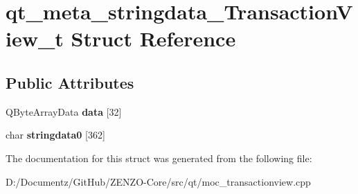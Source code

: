 \hypertarget{structqt__meta__stringdata___transaction_view__t}{}\section{qt\+\_\+meta\+\_\+stringdata\+\_\+\+Transaction\+View\+\_\+t Struct Reference}
\label{structqt__meta__stringdata___transaction_view__t}
\subsection*{Public Attributes}
\begin{DoxyCompactItemize}
\item 
\mbox{\label{structqt__meta__stringdata___transaction_view__t_af53306cc649a0b6436c5f955258c7b5a}} 
Q\+Byte\+Array\+Data {\bfseries data} \mbox{[}32\mbox{]}
\item 
\mbox{\label{structqt__meta__stringdata___transaction_view__t_afecfd814dee997a727a399a43e5cf6e5}} 
char {\bfseries stringdata0} \mbox{[}362\mbox{]}
\end{DoxyCompactItemize}


The documentation for this struct was generated from the following file\+:\begin{DoxyCompactItemize}
\item 
D\+:/\+Documentz/\+Git\+Hub/\+Z\+E\+N\+Z\+O-\/\+Core/src/qt/moc\+\_\+transactionview.\+cpp\end{DoxyCompactItemize}
